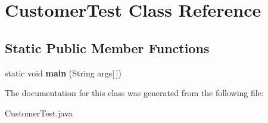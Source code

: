\hypertarget{class_customer_test}{}\section{Customer\+Test Class Reference}
\label{class_customer_test}
\subsection*{Static Public Member Functions}
\begin{DoxyCompactItemize}
\item 
\hypertarget{class_customer_test_a1251be6fcdbe245f67e2d40f6e2c7ed3}{}static void {\bfseries main} (String args\mbox{[}$\,$\mbox{]})\label{class_customer_test_a1251be6fcdbe245f67e2d40f6e2c7ed3}

\end{DoxyCompactItemize}


The documentation for this class was generated from the following file\+:\begin{DoxyCompactItemize}
\item 
Customer\+Test.\+java\end{DoxyCompactItemize}
